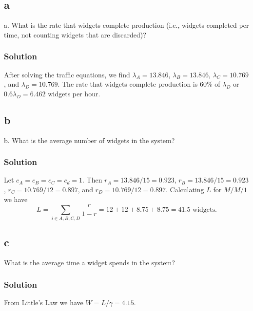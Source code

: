 \documentclass[letterpaper]{amsart}
\begin{document}
\subsection*{a}
a. What is the rate that widgets complete production (i.e., widgets completed per
time, not counting widgets that are discarded)?
\subsubsection*{Solution}
After solving the traffic equations,  we find
$\lambda_A=13.846$, $\lambda_B=13.846$, $\lambda_C=10.769$, and $\lambda_D=10.769$.
The rate that widgets complete production is 60\% of $\lambda_D$ or
$0.6\lambda_D = 6.462$ widgets per hour.

\subsection*{b}
b. What is the average number of widgets in the system?
\subsubsection*{Solution}
Let $c_A=c_B=c_C=c_d=1$. Then $r_A=13.846/15=0.923$, $r_B=13.846/15=0.923$,
$r_C=10.769/12=0.897$, and $r_D=10.769/12=0.897$. Calculating $L$ for $M/M/1$ we
have
\begin{equation*}
  L=\sum_{i\in{A,B,C,D}} \frac{r}{1-r} = 12 + 12 + 8.75 + 8.75 = 41.5\text{ widgets.}
\end{equation*}

\subsection*{c}
What is the average time a widget spends in the system?
\subsubsection*{Solution}
From Little's Law we have $W=L/\gamma=4.15$.
\end{document}
